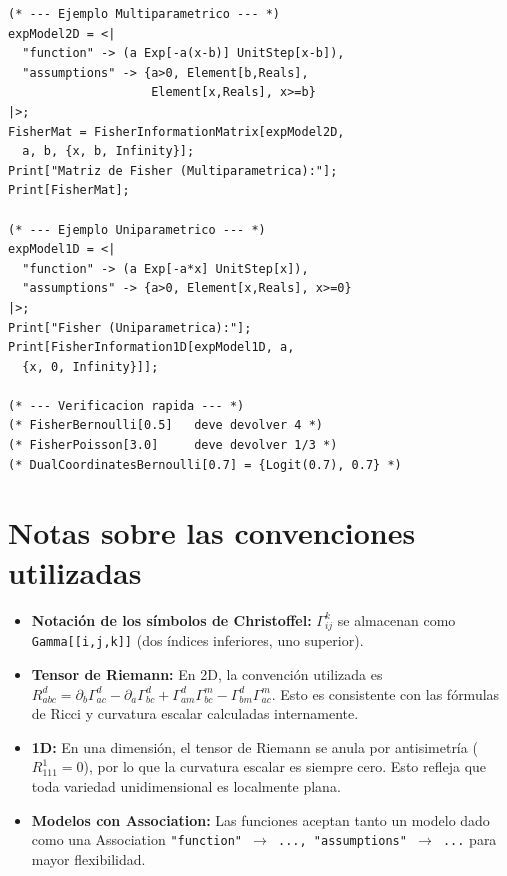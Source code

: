 \begin{lstlisting}
(* --- Ejemplo Multiparametrico --- *)
expModel2D = <|
  "function" -> (a Exp[-a(x-b)] UnitStep[x-b]),
  "assumptions" -> {a>0, Element[b,Reals],
                    Element[x,Reals], x>=b}
|>;
FisherMat = FisherInformationMatrix[expModel2D,
  a, b, {x, b, Infinity}];
Print["Matriz de Fisher (Multiparametrica):"];
Print[FisherMat];

(* --- Ejemplo Uniparametrico --- *)
expModel1D = <|
  "function" -> (a Exp[-a*x] UnitStep[x]),
  "assumptions" -> {a>0, Element[x,Reals], x>=0}
|>;
Print["Fisher (Uniparametrica):"];
Print[FisherInformation1D[expModel1D, a,
  {x, 0, Infinity}]];

(* --- Verificacion rapida --- *)
(* FisherBernoulli[0.5]   deve devolver 4 *)
(* FisherPoisson[3.0]     deve devolver 1/3 *)
(* DualCoordinatesBernoulli[0.7] = {Logit(0.7), 0.7} *)
\end{lstlisting}

\section{Notas sobre las convenciones utilizadas}

\begin{itemize}
	\item \textbf{Notación de los símbolos de Christoffel:} $\Gamma^{k}_{ij}$ se almacenan como \texttt{Gamma[[i,j,k]]} (dos índices inferiores, uno superior).
	\item \textbf{Tensor de Riemann:} En 2D, la convención utilizada es $R^{d}_{abc} = \partial_b \Gamma^{d}_{ac} - \partial_a \Gamma^{d}_{bc} + \Gamma^{d}_{am}\Gamma^{m}_{bc} - \Gamma^{d}_{bm}\Gamma^{m}_{ac}$.  Esto es consistente con las fórmulas de Ricci y curvatura escalar calculadas internamente.
	\item \textbf{1D:} En una dimensión, el tensor de Riemann se anula por antisimetría ($R^{1}_{111}=0$), por lo que la curvatura escalar es siempre cero.  Esto refleja que toda variedad unidimensional es localmente plana.
	\item \textbf{Modelos con Association:} Las funciones aceptan tanto un modelo dado como una Association \texttt{"function" $\to$ ..., "assumptions" $\to$ ...} para mayor flexibilidad.
\end{itemize}
